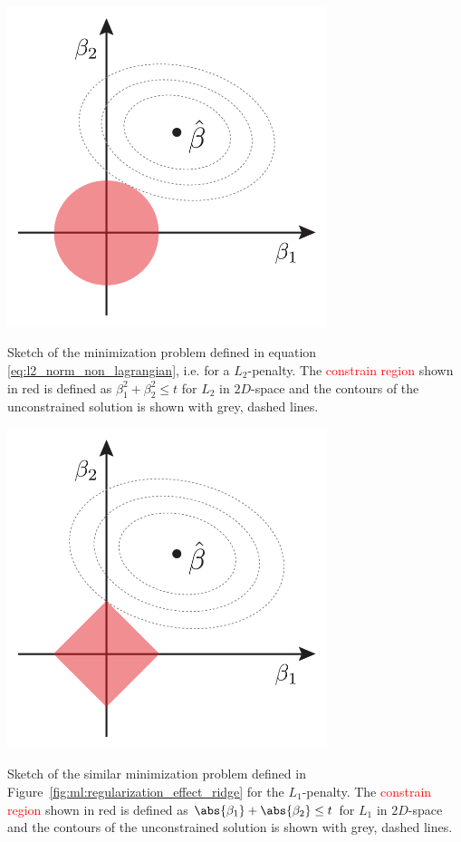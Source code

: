 \begin{marginfigure}
  \includegraphics[width=0.7\textwidth]{figures/ridge_lasso_sparse/ridge.pdf}
  \caption[Regularization Effect of $L_2$ ]
    {Sketch of the minimization problem defined in equation \eqref{eq:l2_norm_non_lagrangian}, i.e. for a $L_2$-penalty. The \textcolor{red}{constrain region} shown in red is defined as $\beta_1^2 + \beta_2^2 \leq t$ for $L_2$ in $2D$-space and the contours of the unconstrained solution is shown with grey, dashed lines. 
    }
  \label{fig:ml:regularization_effect_ridge}
\end{marginfigure}
\begin{marginfigure}
  \includegraphics[width=0.7\textwidth]{figures/ridge_lasso_sparse/lasso.pdf}
  \caption[Regularization Effect of $L_1$]
    {Sketch of the similar minimization problem defined in Figure~\ref{fig:ml:regularization_effect_ridge} for the $L_1$-penalty. The \textcolor{red}{constrain region} shown in red is defined as $\abs{\beta_1} + \abs{\beta_2} \leq t$ for $L_1$ in $2D$-space and the contours of the unconstrained solution is shown with grey, dashed lines.
    }
  \label{fig:ml:regularization_effect_lasso}
\end{marginfigure} 

